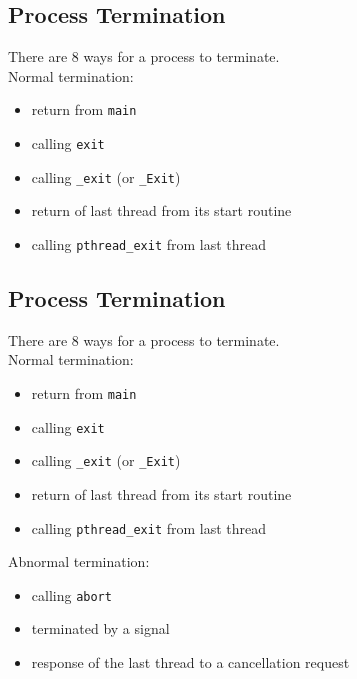 \documentclass[xga]{xdvislides}
\begin{document}
\subsection{Process Termination}
There are 8 ways for a process to terminate.
\\

Normal termination:
\begin{itemize}
	\item return from {\tt main}
	\item calling {\tt exit}
	\item calling {\tt \_exit} (or {\tt\_Exit})
	\item return of last thread from its start routine
	\item calling {\tt pthread\_exit} from last thread
\end{itemize}
\vspace{.25in}

\subsection{Process Termination}
There are 8 ways for a process to terminate.
\\

Normal termination:
\begin{itemize}
	\item return from {\tt main}
	\item calling {\tt exit}
	\item calling {\tt \_exit} (or {\tt\_Exit})
	\item return of last thread from its start routine
	\item calling {\tt pthread\_exit} from last thread
\end{itemize}
\vspace{.25in}
Abnormal termination:
\begin{itemize}
	\item calling {\tt abort}
	\item terminated by a signal
	\item response of the last thread to a cancellation request
\end{itemize}
\end{document}

